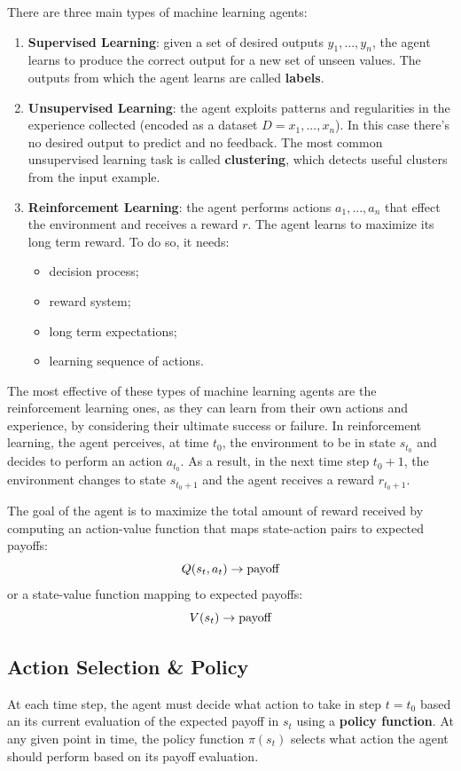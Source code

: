 \documentclass{article}
\begin{document}
There are three main types of machine learning agents:
\begin{enumerate}
    \item \textbf{Supervised Learning}: given a set of desired outputs \(y_1, ..., y_n\), the agent learns to produce the correct output for a new set of unseen values. The outputs from which the agent learns are called \textbf{labels}.
    \item \textbf{Unsupervised Learning}: the agent exploits patterns and regularities in the experience collected (encoded as a dataset \(D = x_1, ..., x_n\)). In this case there's no desired output to predict and no feedback. The most common unsupervised learning task is called \textbf{clustering}, which detects useful clusters from the input example.
    \item \textbf{Reinforcement Learning}: the agent performs actions \(a_1, ..., a_n\) that effect the environment and receives a reward \(r\). The agent learns to maximize its long term reward. To do so, it needs:
    \begin{itemize}
        \item decision process;
        \item reward system;
        \item long term expectations;
        \item learning sequence of actions.
    \end{itemize}
\end{enumerate}

The most effective of these types of machine learning agents are the reinforcement learning ones, as they can learn from their own actions and experience, by considering their ultimate success or failure. In reinforcement learning, the agent perceives, at time \(t_0\), the environment to be in state \(s_{t_0}\) and decides to perform an action \(a_{t_0}\). As a result, in the next time step \(t_0+1\), the environment changes to state \(s_{t_0+1}\) and the agent receives a reward \(r_{t_0+1}\). 

The goal of the agent is to maximize the total amount of reward received by computing an action-value function that maps state-action pairs to expected payoffs:
\[Q(s_t, a_t) \to \textnormal{payoff}\]
or a state-value function mapping to expected payoffs:
\[V(s_t) \to \textnormal{payoff}\]

\subsection{Action Selection \& Policy}
At each time step, the agent must decide what action to take in step \(t=t_0\) based an its current evaluation of the expected payoff in \(s_t\) using a \textbf{policy function}. At any given point in time, the policy function \(\pi(s_t)\) selects what action the agent should perform based on its payoff evaluation.
\end{document}
